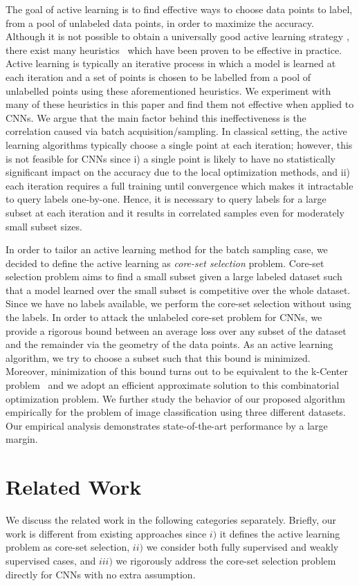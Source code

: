 \documentclass{article} %
\begin{document}
The goal of active learning is to find effective ways to choose data points to label, from a pool of unlabeled data points, in order to maximize the
accuracy. Although it is not possible to obtain a universally good active learning strategy \citep{dasgupta2004analysis}, there exist many
heuristics~\citep{settles2010active} which have been proven to be effective in practice. Active learning is typically an iterative process in which a
model is learned at each iteration and a set of points is chosen to be labelled from a pool of unlabelled points using these aforementioned heuristics. We experiment
with many of these heuristics in this paper and find them not effective when applied to CNNs. We argue that
the main factor behind this ineffectiveness is the correlation caused via batch acquisition/sampling. In classical setting, the active learning algorithms
typically choose a single point at each iteration; however, this is not feasible for CNNs since i) a single point is likely to have no statistically
significant impact on the accuracy due to the local optimization methods, and ii) each iteration requires a full training until convergence which
makes it intractable to query labels one-by-one. Hence, it is necessary to query labels for a large subset at each iteration and it results in correlated samples even for
moderately small subset sizes.

In order to tailor an active learning method for the batch sampling case, we decided to define the active learning as \emph{core-set selection} problem. Core-set selection problem aims to find a small subset given a large labeled dataset such that a model learned over the small subset is competitive over the whole dataset. Since
we have no labels available, we perform the core-set selection without using
the labels. In order to attack the unlabeled core-set problem for CNNs, we provide a rigorous bound between an average loss over any subset of the dataset and
the remainder via the geometry of the data points. As an active learning algorithm, we try to choose a subset such that this bound is minimized. Moreover, minimization of this bound turns out to be equivalent to the k-Center problem~\citep{facility} and we adopt an efficient approximate solution to this 
combinatorial optimization problem. We further study the behavior of our proposed algorithm empirically for the problem of image classification using three different datasets. Our empirical analysis demonstrates state-of-the-art performance by a large margin. 


\section{Related Work} We discuss the related work in the following categories
separately. Briefly, our work is different from existing approaches since $i)$
it defines the active learning problem as core-set selection, $ii)$ we consider
both fully supervised and weakly supervised cases, and $ iii)$ we rigorously
address the core-set selection problem directly for CNNs with no extra
assumption. 
\end{document}
